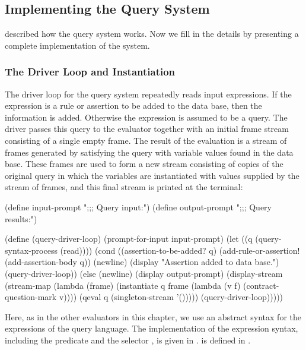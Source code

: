 \subsection{Implementing the Query System}
\label{Section 4.4.4}

 described how the query system works. Now we fill in the
details by presenting a complete implementation of the system.



\subsubsection{The Driver Loop and Instantiation}
\label{Section 4.4.4.1}

The driver loop for the query system repeatedly reads input expressions.  If
the expression is a rule or assertion to be added to the data base, then the
information is added.  Otherwise the expression is assumed to be a query.  The
driver passes this query to the evaluator  together with an initial
frame stream consisting of a single empty frame.  The result of the evaluation
is a stream of frames generated by satisfying the query with variable values
found in the data base.  These frames are used to form a new stream consisting
of copies of the original query in which the variables are instantiated with
values supplied by the stream of frames, and this final stream is printed at
the terminal:

\begin{codeBlock}
(define input-prompt  ";;; Query input:")
(define output-prompt ";;; Query results:")

(define (query-driver-loop)
  (prompt-for-input input-prompt)
  (let ((q (query-syntax-process (read))))
    (cond ((assertion-to-be-added? q)
           (add-rule-or-assertion! (add-assertion-body q))
           (newline)
           (display "Assertion added to data base.")
           (query-driver-loop))
          (else
           (newline)
           (display output-prompt)
           (display-stream
            (stream-map
             (lambda (frame)
               (instantiate
                q
                frame
                (lambda (v f)
                  (contract-question-mark v))))
             (qeval q (singleton-stream '()))))
           (query-driver-loop)))))
\end{codeBlock}

\noindent
Here, as in the other evaluators in this chapter, we use an abstract syntax for
the expressions of the query language.  The implementation of the expression
syntax, including the predicate  and the selector
, is given in .
 is defined in .

